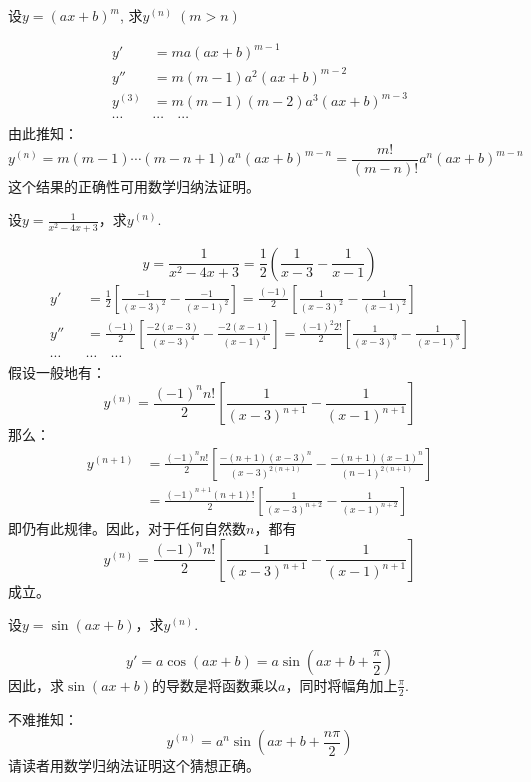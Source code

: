 \begin{example}
  设$y=(ax+b)^m$, 求$y^{(n)}\; (m>n)$  
\end{example}

\begin{solution}
\[\begin{split}
y'&=ma(ax+b)^{m-1}\\
y''&=m(m-1)a^2(ax+b)^{m-2}\\
y^{(3)}&=m(m-1)(m-2)a^3(ax+b)^{m-3}\\
\cdots\quad &\cdots\quad \cdots
\end{split}\]
由此推知：
\[y^{(n)}=m(m-1)\cdots(m-n+1)a^n(ax+b)^{m-n}=\frac{m!}{(m-n)!}a^n(ax+b)^{m-n}\]
这个结果的正确性可用数学归纳法证明。
\end{solution}


\begin{example}
设$y=\frac{1}{x^2-4x+3}$，求$y^{(n)}$.
\end{example}


\begin{solution}
\[y=\frac{1}{x^2-4x+3}=\frac{1}{2}\left(\frac{1}{x-3}-\frac{1}{x-1}\right)\]
\[\begin{split}
    y'&=\frac{1}{2}\left[\frac{-1}{(x-3)^2}-\frac{-1}{(x-1)^2}\right]=\frac{(-1)}{2}\left[\frac{1}{(x-3)^2}-\frac{1}{(x-1)^2}\right]\\
    y''&=\frac{(-1)}{2}\left[\frac{-2(x-3)}{(x-3)^4}-\frac{-2(x-1)}{(x-1)^4}\right]=\frac{(-1)^2 2!}{2}\left[\frac{1}{(x-3)^3}-\frac{1}{(x-1)^3}\right]\\
    \cdots\quad &\cdots\quad \cdots
\end{split}\]
假设一般地有：
\[y^{(n)}=\frac{(-1)^n n!}{2}\left[\frac{1}{(x-3)^{n+1}}-\frac{1}{(x-1)^{n+1}}\right]\]
那么：
\[\begin{split}
    y^{(n+1)}&=\frac{(-1)^n n!}{2}\left[\frac{-(n+1)(x-3)^n}{(x-3)^{2(n+1)}}-\frac{-(n+1)(x-1)^n}{(n-1)^{2(n+1)}}\right]\\
    &=\frac{(-1)^{n+1} (n+1)!}{2}\left[\frac{1}{(x-3)^{n+2}}-\frac{1}{(x-1)^{n+2}}\right]
\end{split}\]
即仍有此规律。因此，对于任何自然数$n$，都有
\[y^{(n)}=\frac{(-1)^n n!}{2}\left[\frac{1}{(x-3)^{n+1}}-\frac{1}{(x-1)^{n+1}}\right]\]
成立。
\end{solution}

\begin{example}
    设$y=\sin(ax+b)$，求$y^{(n)}$.
\end{example}


\begin{solution}
    \[y'=a\cos(ax+b)=a\sin\left(ax+b+\frac{\pi}{2}\right)\]
因此，求$\sin(ax+b)$的导数是将函数乘以$a$，同时将幅角加上$\frac{\pi}{2}$.

不难推知：
\[y^{(n)}=a^n\sin\left(ax+b+\frac{n\pi}{2}\right)\]
请读者用数学归纳法证明这个猜想正确。
\end{solution}


